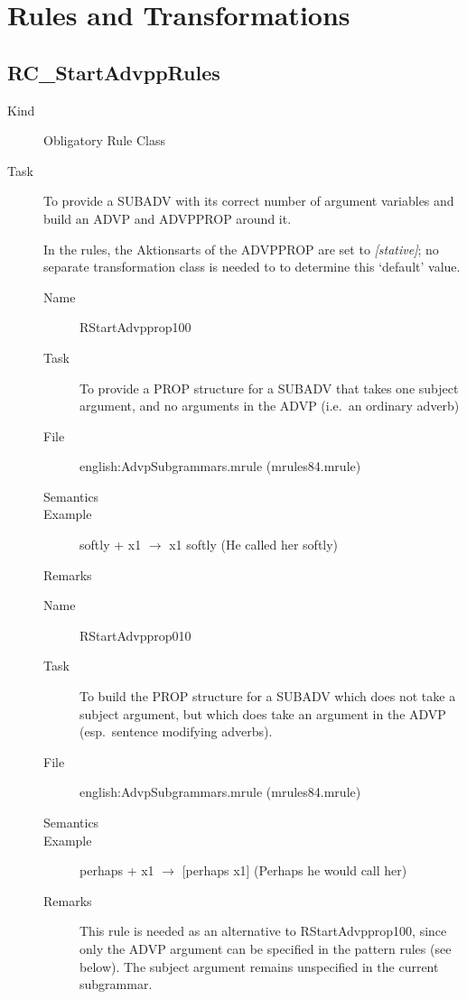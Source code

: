 \newpage
\section{Rules and Transformations}

\subsection{RC\_StartAdvppRules}
\begin{description}
\item[Kind] Obligatory Rule Class
\item[Task] To provide a SUBADV with its correct number of argument variables 
and build an ADVP and ADVPPROP around it. 

In the rules, the Aktionsarts of the ADVPPROP are set to {\em [stative]\/};
no separate transformation class is needed to to determine this `default' 
value.

\vspace{1 cm}
\begin{description}
\item[Name] RStartAdvpprop100
\item[Task] To provide a PROP structure for a SUBADV that takes one subject 
argument, and no arguments in the ADVP (i.e.\ an ordinary adverb)
\item[File] english:AdvpSubgrammars.mrule (mrules84.mrule)
\item[Semantics]
\item[Example] softly + x1 $\rightarrow$ x1 softly (He called her softly)
\item[Remarks]
\end{description}

\vspace{1 cm}
\begin{description}
\item[Name] RStartAdvpprop010
\item[Task] To build the PROP structure for a SUBADV which does not take a
subject argument, but which does take an argument in the ADVP (esp.\ sentence 
modifying adverbs).
\item[File] english:AdvpSubgrammars.mrule (mrules84.mrule)
\item[Semantics]
\item[Example] perhaps + x1 $\rightarrow$ [perhaps x1] (Perhaps he would call 
her)
\item[Remarks] This rule is needed as an alternative to RStartAdvpprop100, 
since only the ADVP argument can be specified in the pattern rules (see below). 
The subject argument remains unspecified in the current subgrammar.
\end{description}


\end{description}
